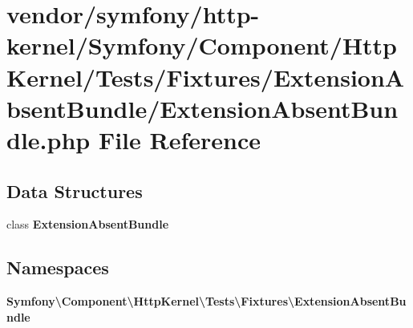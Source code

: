 \section{vendor/symfony/http-\/kernel/\+Symfony/\+Component/\+Http\+Kernel/\+Tests/\+Fixtures/\+Extension\+Absent\+Bundle/\+Extension\+Absent\+Bundle.php File Reference}
\label{_extension_absent_bundle_8php}
\subsection*{Data Structures}
\begin{DoxyCompactItemize}
\item 
class {\bf Extension\+Absent\+Bundle}
\end{DoxyCompactItemize}
\subsection*{Namespaces}
\begin{DoxyCompactItemize}
\item 
 {\bf Symfony\textbackslash{}\+Component\textbackslash{}\+Http\+Kernel\textbackslash{}\+Tests\textbackslash{}\+Fixtures\textbackslash{}\+Extension\+Absent\+Bundle}
\end{DoxyCompactItemize}
